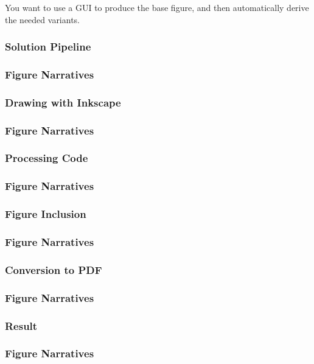 {\begin{frame}[fragile]
  \vspace{5mm}
  You want to use a GUI to produce the base figure, and then automatically derive the needed variants.
\end{frame}

\subsubsection{Solution Pipeline}
\begin{frame}[fragile]
  \frametitle{Figure Narratives }
  \vspace{3mm}
  
\end{frame}

\subsubsection{Drawing with Inkscape}
\begin{frame}[fragile]
  \frametitle{Figure Narratives }
  \vspace{3mm}
  
\end{frame}

\subsubsection{Processing Code}
\begin{frame}[fragile]
  \frametitle{Figure Narratives }
  \vspace{3mm}
  
\end{frame}

\subsubsection{Figure Inclusion}
\begin{frame}[fragile]
  \frametitle{Figure Narratives }
  \vspace{3mm}
  
\end{frame}

\subsubsection{Conversion to PDF}
\begin{frame}[fragile]
  \frametitle{Figure Narratives }
  \vspace{3mm}
  
\end{frame}

\subsubsection{Result}
\begin{frame}[fragile]
  \frametitle{Figure Narratives }
  \vspace{3mm}
  
\end{frame}

}

